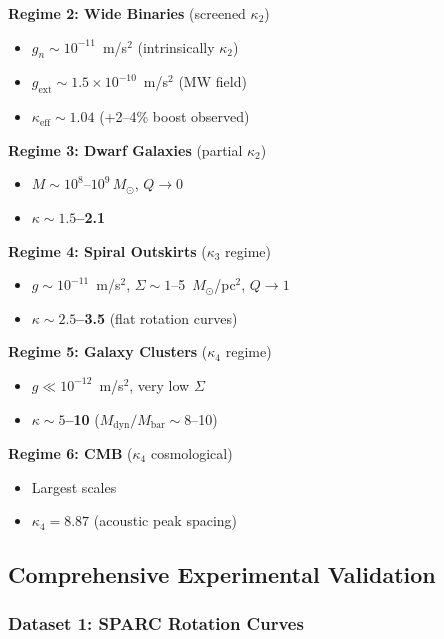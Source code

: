 \documentclass[11pt,a4paper]{article}
\theoremstyle{definition}
\theoremstyle{remark}
\begin{document}
	\textbf{Regime 2: Wide Binaries} (screened $\kappa_2$)
	\begin{itemize}
		\item $g_n \sim 10^{-11}$~m/s$^2$ (intrinsically $\kappa_2$)
		\item $g_{\text{ext}} \sim 1.5 \times 10^{-10}$~m/s$^2$ (MW field)
		\item \textbf{$\kappa_{\text{eff}} \sim 1.04$} (+2--4\% boost observed)
	\end{itemize}
	
	\textbf{Regime 3: Dwarf Galaxies} (partial $\kappa_2$)
	\begin{itemize}
		\item $M \sim 10^8$--$10^9\, M_\odot$, $Q \to 0$
		\item \textbf{$\kappa \sim 1.5$--2.1}
	\end{itemize}
	
	\textbf{Regime 4: Spiral Outskirts} ($\kappa_3$ regime)
	\begin{itemize}
		\item $g \sim 10^{-11}$~m/s$^2$, $\Sigma \sim 1$--5~$M_\odot$/pc$^2$, $Q \to 1$
		\item \textbf{$\kappa \sim 2.5$--3.5} (flat rotation curves)
	\end{itemize}
	
	\textbf{Regime 5: Galaxy Clusters} ($\kappa_4$ regime)
	\begin{itemize}
		\item $g \ll 10^{-12}$~m/s$^2$, very low $\Sigma$
		\item \textbf{$\kappa \sim 5$--10} ($M_{\text{dyn}}/M_{\text{bar}} \sim 8$--10)
	\end{itemize}
	
	\textbf{Regime 6: CMB} ($\kappa_4$ cosmological)
	\begin{itemize}
		\item Largest scales
		\item \textbf{$\kappa_4 = 8.87$} (acoustic peak spacing)
	\end{itemize}
	
	\subsection{Comprehensive Experimental Validation}
	
	\subsubsection{Dataset 1: SPARC Rotation Curves}
	
\end{document}
